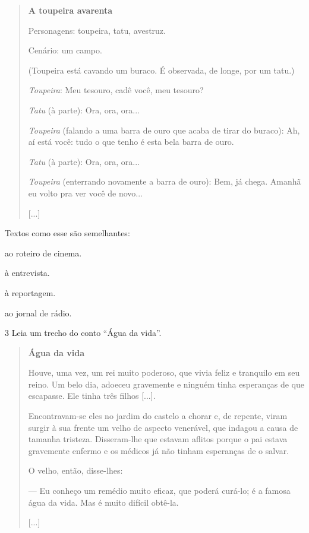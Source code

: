 \begin{quote}
\textbf{A toupeira avarenta}

Personagens: toupeira, tatu, avestruz.

Cenário: um campo.

(Toupeira está cavando um buraco. É observada, de longe, por um tatu.)

\emph{Toupeira}: Meu tesouro, cadê você, meu tesouro?

\emph{Tatu} (à parte): Ora, ora, ora...

\emph{Toupeira} (falando a uma barra de ouro que acaba de tirar do
buraco): Ah, aí está você: tudo o que tenho é esta bela barra de ouro.

\emph{Tatu} (à parte): Ora, ora, ora...

\emph{Toupeira} (enterrando novamente a barra de ouro): Bem, já chega.
Amanhã eu volto pra ver você de novo...

{[}...{]}

\end{quote}

Textos como esse são semelhantes:

\begin{escolha}[itemsep=-5pt]
\item ao roteiro de cinema.

\item à entrevista.

\item à reportagem.

\item ao jornal de rádio.
\end{escolha}

\num{3} Leia um trecho do conto ``Água da vida''.

\begin{quote}
\textbf{Água da vida}

Houve, uma vez, um rei muito poderoso, que vivia feliz e tranquilo em
seu reino. Um belo dia, adoeceu gravemente e ninguém tinha esperanças de
que escapasse. Ele tinha três filhos {[}...{]}.

Encontravam-se eles no jardim do castelo a chorar e, de repente, viram
surgir à sua frente um velho de aspecto venerável, que indagou a causa
de tamanha tristeza. Disseram-lhe que estavam aflitos porque o pai
estava gravemente enfermo e os médicos já não tinham esperanças de o
salvar.

O velho, então, disse-lhes:

--- Eu conheço um remédio muito eficaz, que poderá curá-lo; é a famosa
água da vida. Mas é muito difícil obtê-la.

{[}...{]}

\end{quote}

